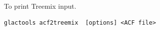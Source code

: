 \documentclass[a4paper]{article}
\begin{document}
To print Treemix input.
\begin{lstlisting}
glactools acf2treemix  [options] <ACF file>
\end{lstlisting}










\newpage





%



 
\end{document}
